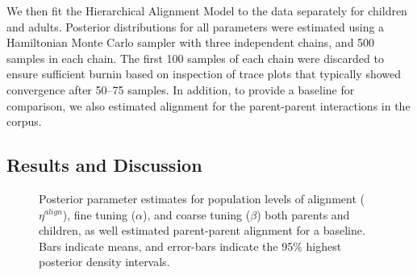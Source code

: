 \documentclass[10pt,letterpaper]{article}
\begin{document}
We then fit the Hierarchical Alignment Model to the data separately for children and adults. Posterior distributions for all parameters were estimated using a Hamiltonian Monte Carlo sampler \cite{carpenter2015} with three independent chains, and 500 samples in each chain. The first 100 samples of each chain were discarded to ensure sufficient burnin based on inspection of trace plots that typically showed convergence after 50--75 samples. In addition, to provide a baseline for comparison, we also estimated alignment for the parent-parent interactions in the corpus.

\subsection{Results and Discussion}

\begin{figure}[t]
  \caption{\label{fig:model_parameters} Posterior parameter estimates for population levels of alignment ($\eta^{align}$), fine tuning ($\alpha$), and coarse tuning ($\beta$) both parents and children, as well estimated parent-parent alignment for a baseline. Bars indicate means, and error-bars indicate the 95\% highest posterior density intervals.}
\end{figure}

\end{document}
